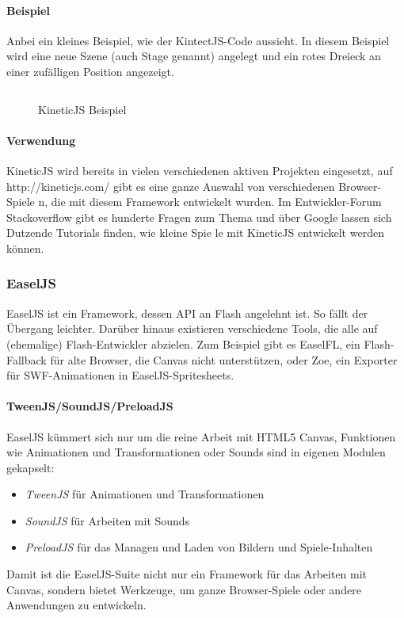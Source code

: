 \documentclass[a4paper, 12pt]{article}
\begin{document}
\paragraph{Beispiel}
Anbei ein kleines Beispiel, wie der KintectJS-Code aussieht. In diesem Beispiel wird eine neue Szene (auch Stage genannt) angelegt und ein rotes Dreieck an einer zufälligen Position angezeigt.
\begin{figure}[h!]
	\inputminted{javascript}{assets/kineticjs_example.js}
	\caption{KineticJS Beispiel}
	\label{kineticjs_example}
\end{figure}
\paragraph{Verwendung} KineticJS wird bereits in vielen verschiedenen aktiven Projekten eingesetzt, auf http://kineticjs.com/ gibt es eine ganze Auswahl von verschiedenen Browser-Spiele
n, die mit diesem Framework entwickelt wurden. Im Entwickler-Forum Stackoverflow gibt es hunderte Fragen zum Thema und über Google lassen sich Dutzende Tutorials finden, wie kleine Spie
le mit KineticJS entwickelt werden können.
\subsubsection{EaselJS}
EaselJS ist ein Framework, dessen API an Flash angelehnt ist. So fällt der Übergang leichter. Darüber hinaus existieren verschiedene Tools, die alle auf (ehemalige) Flash-Entwickler abzielen. Zum Beispiel gibt es EaselFL, ein Flash-Fallback für alte Browser, die Canvas nicht unterstützen, oder Zoe, ein Exporter für SWF-Animationen in EaselJS-Spritesheets.
\paragraph{TweenJS/SoundJS/PreloadJS} EaselJS kümmert sich nur um die reine Arbeit mit HTML5 Canvas, Funktionen wie Animationen und Transformationen oder Sounds sind in eigenen Modulen gekapselt:
\begin{itemize}
	\item \emph{TweenJS} für Animationen und Transformationen
	\item \emph{SoundJS} für Arbeiten mit Sounds
	\item \emph{PreloadJS} für das Managen und Laden von Bildern und Spiele-Inhalten
\end{itemize}
Damit ist die EaselJS-Suite nicht nur ein Framework für das Arbeiten mit Canvas, sondern bietet Werkzeuge, um ganze Browser-Spiele oder andere Anwendungen zu entwickeln.
\end{document}
